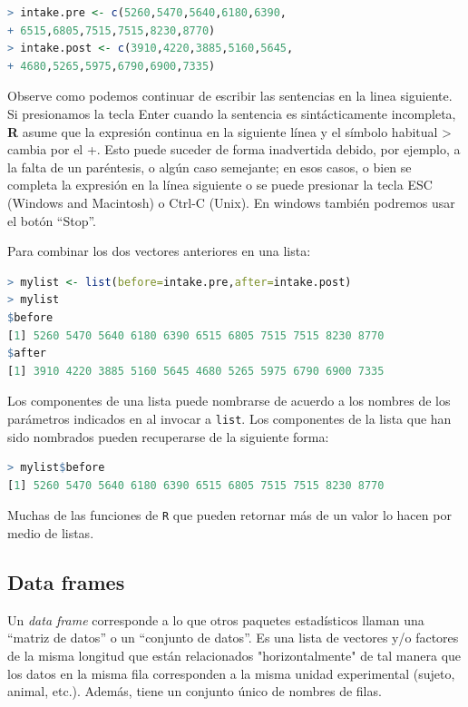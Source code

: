 \begin{lstlisting}[language=R]
> intake.pre <- c(5260,5470,5640,6180,6390,
+ 6515,6805,7515,7515,8230,8770)
> intake.post <- c(3910,4220,3885,5160,5645,
+ 4680,5265,5975,6790,6900,7335)
\end{lstlisting}

Observe como podemos continuar de escribir las sentencias en la linea
siguiente. Si presionamos la tecla Enter cuando la sentencia es sintácticamente
incompleta, \textbf{R} asume que la expresión continua en la siguiente línea y el
símbolo habitual > cambia por el +. Esto puede suceder de forma inadvertida
debido, por ejemplo, a la falta de un paréntesis, o algún caso semejante; en
esos casos, o bien se completa la expresión en la línea siguiente o se puede
presionar la tecla ESC (Windows and Macintosh) o Ctrl-C (Unix). En windows
también podremos usar el botón ``Stop''.

Para combinar los dos vectores anteriores en una lista:

\begin{lstlisting}[language=R]
> mylist <- list(before=intake.pre,after=intake.post)
> mylist
$before
[1] 5260 5470 5640 6180 6390 6515 6805 7515 7515 8230 8770
$after
[1] 3910 4220 3885 5160 5645 4680 5265 5975 6790 6900 7335
\end{lstlisting}

Los componentes de una lista puede nombrarse de acuerdo a los nombres de los
parámetros indicados en al invocar a \texttt{list}. Los componentes de la lista
que han sido nombrados pueden recuperarse de la siguiente forma:

\begin{lstlisting}[language=R]
> mylist$before
[1] 5260 5470 5640 6180 6390 6515 6805 7515 7515 8230 8770
\end{lstlisting}

Muchas de las funciones de \texttt{R} que pueden retornar más de un valor lo
hacen por medio de listas.

\subsection{Data frames}

Un \textit{data frame} corresponde a lo que otros paquetes estadísticos llaman
una ``matriz de datos'' o un ``conjunto de datos''. Es una lista de vectores y/o
factores de la misma longitud que están relacionados "horizontalmente" de tal manera
que los datos en la misma fila corresponden a la misma unidad experimental
(sujeto, animal, etc.). Además, tiene un conjunto único de nombres de filas.

